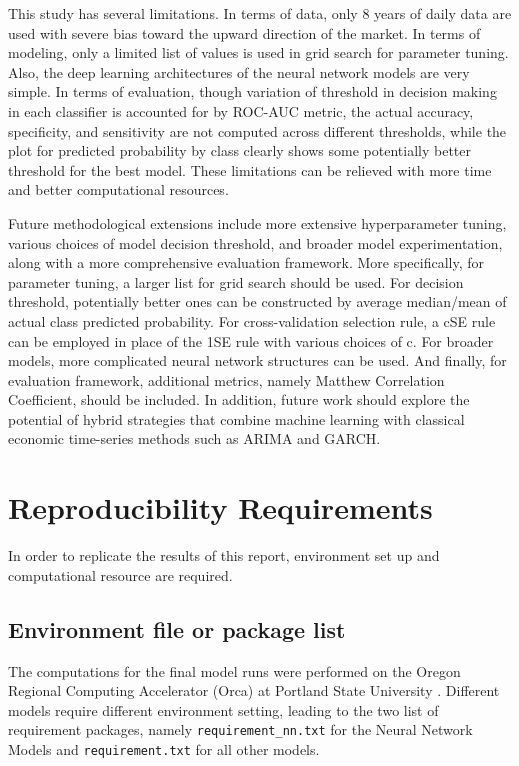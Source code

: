 \documentclass[11pt]{article}
\begin{document}
This study has several limitations. In terms of data, only 8 years of daily data are used with severe bias toward the upward direction of the market. In terms of modeling, only a limited list of values is used in grid search for parameter tuning. Also, the deep learning architectures of the neural network models are very simple. In terms of evaluation, though variation of threshold in decision making in each classifier is accounted for by ROC-AUC metric, the actual accuracy, specificity, and sensitivity are not computed across different thresholds, while the plot for predicted probability by class clearly shows some potentially better threshold for the best model. These limitations can be relieved with more time and better computational resources.

Future methodological extensions include more extensive hyperparameter tuning, various choices of model decision threshold, and broader model experimentation, along with a more comprehensive evaluation framework. More specifically, for parameter tuning, a larger list for grid search should be used. For decision threshold, potentially better ones can be constructed by average median/mean of actual class predicted probability. For cross-validation selection rule, a cSE rule can be employed in place of the 1SE rule with various choices of c. For broader models, more complicated neural network structures can be used. And finally, for evaluation framework, additional metrics, namely Matthew Correlation Coefficient, should be included. In addition, future work should explore the potential of hybrid strategies that combine machine learning with classical economic time-series methods such as ARIMA and GARCH.

\section{Reproducibility Requirements}
In order to replicate the results of this report, environment set up and computational resource are required. 
\subsection{Environment file or package list}
The computations for the final model runs were performed on the Oregon Regional Computing Accelerator (Orca) at Portland State University \cite{orca_2026}. Different models require different environment setting, leading to the two list of requirement packages, namely \texttt{requirement\_nn.txt} for the Neural Network Models and \texttt{requirement.txt} for all other models.
\end{document}
